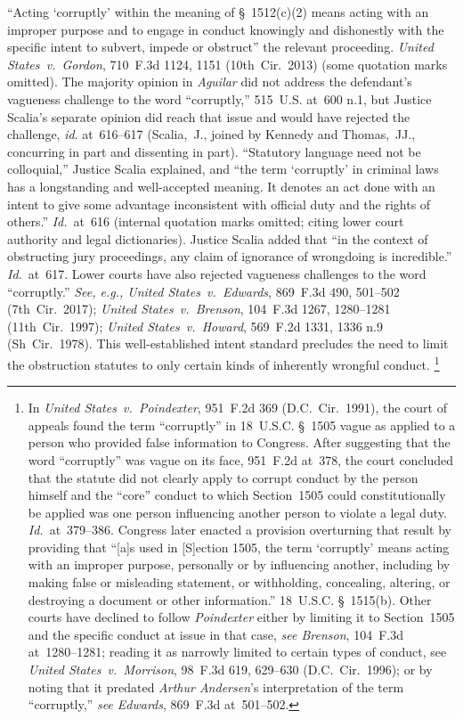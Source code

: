 ``Acting `corruptly' within the meaning of \S~1512(c)(2) means acting with an improper purpose and to engage in conduct knowingly and dishonestly with the specific intent to subvert, impede or obstruct'' the relevant proceeding.
\textit{United States~v.\ Gordon}, 710~F.3d 1124, 1151 (10th~Cir.~2013) (some quotation marks omitted).
The majority opinion in \textit{Aguilar} did not address the defendant's vagueness challenge to the word ``corruptly,'' 515~U.S. at~600 n.1, but Justice Scalia's separate opinion did reach that issue and would have rejected the challenge, \textit{id}. at~616--617 (Scalia,~J., joined by Kennedy and Thomas,~JJ., concurring in part and dissenting in part).
``Statutory language need not be colloquial,'' Justice Scalia explained, and ``the term `corruptly' in criminal laws has a longstanding and well-accepted meaning.
It denotes an act done with an intent to give some advantage inconsistent with official duty and the rights of others.''
\textit{Id.}~at~616 (internal quotation marks omitted; citing lower court authority and legal dictionaries).
Justice Scalia added that ``in the context of obstructing jury proceedings, any claim of ignorance of wrongdoing is incredible.''
\textit{Id.}~at~617.
Lower courts have also rejected vagueness challenges to the word ``corruptly.''
\textit{See, e.g., United States~v.\ Edwards}, 869~F.3d 490, 501--502 (7th~Cir.~2017);
\textit{United States~v.\ Brenson}, 104~F.3d 1267, 1280--1281 (11th~Cir.~1997);
\textit{United States~v.\ Howard}, 569~F.2d 1331, 1336 n.9 (Sh~Cir.~1978).
This well-established intent standard precludes the need to limit the obstruction statutes to only certain kinds of inherently wrongful conduct.%
\footnote{In \textit{United States~v.\ Poindexter}, 951~F.2d 369 (D.C.~Cir.~1991), the court of appeals found the term ``corruptly'' in 18~U.S.C. \S~1505 vague as applied to a person who provided false information to Congress.
After suggesting that the word ``corruptly'' was vague on its face, 951~F.2d at~378, the court concluded that the statute did not clearly apply to corrupt conduct by the person himself and the ``core'' conduct to which Section~1505 could constitutionally be applied was one person influencing another person to violate a legal duty.
\textit{Id.}~at~379--386.
Congress later enacted a provision overturning that result by providing that ``[a]s used in [S]ection 1505, the term `corruptly' means acting with an improper purpose, personally or by influencing another, including by making false or misleading statement, or withholding, concealing, altering, or destroying a document or other information.''
18~U.S.C. \S~1515(b).
Other courts have declined to follow \textit{Poindexter} either by limiting it to Section~1505 and the specific conduct at issue in that case, \textit{see Brenson}, 104~F.3d at~1280--1281;
reading it as narrowly limited to certain types of conduct, see \textit{United States~v.\ Morrison}, 98~F.3d 619, 629--630 (D.C.~Cir.~1996);
or by noting that it predated \textit{Arthur Andersen}'s interpretation of the term ``corruptly,'' \textit{see Edwards}, 869~F.3d at~501--502.
 }


